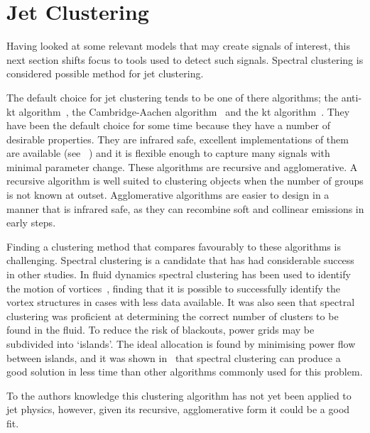 \section{Jet Clustering}\label{sec:JetClustering}
Having looked at some relevant models that may create signals of interest,
this next section shifts focus to tools used to detect such signals.
Spectral clustering is considered possible method for jet clustering.

The default choice for jet clustering tends to be one of there algorithms;
the anti-kt algorithm~\cite{Cacciari2008akt}, the Cambridge-Aachen algorithm~\cite{Wobisch1998caJet} and the kt algorithm~\cite{Ellis1993ktJet}.
They have been the default choice for some time because they have a number of desirable properties.
They are infrared safe, excellent implementations of them are available (see \fastjet{}~\cite{Cacciari2011FastJet})
and it is flexible enough to capture many signals with minimal parameter change.
These algorithms are recursive and agglomerative.
A recursive algorithm is well suited to clustering objects when the number of groups is not known at outset.
Agglomerative algorithms are easier to design in a manner that is infrared safe,
as they can recombine soft and collinear emissions in early steps.

Finding a clustering method that compares favourably to these algorithms is challenging.
Spectral clustering is a candidate that has had considerable success in other studies.
In fluid dynamics spectral clustering has been used to identify the motion
of vortices~\cite{hadjighasem2016votex}, finding that it is possible
to successfully identify the vortex structures in cases with less data available.
It was also seen that spectral clustering was proficient at determining the correct number
of clusters to be found in the fluid.
To reduce the risk of blackouts, power grids may be subdivided into `islands'.
The ideal allocation is found by minimising power flow between islands,
and it was shown in~\cite{fennelly2014power} that spectral clustering
can produce a good solution in less time than other algorithms commonly used for this problem.


To the authors knowledge this clustering algorithm has not yet been applied to jet physics, %
however, given its recursive, agglomerative form it could be a good fit.
